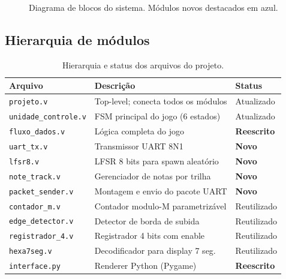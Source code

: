 \documentclass[12pt,a4paper]{article}
\begin{document}
\begin{figure}[H]
\caption{Diagrama de blocos do sistema. Módulos novos destacados em azul.}
\end{figure}

\subsection{Hierarquia de módulos}

\begin{table}[H]
\centering
\begin{tabularx}{\textwidth}{lXl}
\toprule
\textbf{Arquivo} & \textbf{Descrição} & \textbf{Status} \\
\midrule
\texttt{projeto.v}          & Top-level; conecta todos os módulos  & Atualizado \\
\texttt{unidade\_controle.v}& FSM principal do jogo (6 estados)    & Atualizado \\
\texttt{fluxo\_dados.v}     & Lógica completa do jogo              & \textcolor{fpgablue}{\textbf{Reescrito}} \\
\texttt{uart\_tx.v}         & Transmissor UART 8N1                 & \textcolor{fpgablue}{\textbf{Novo}} \\
\texttt{lfsr8.v}            & LFSR 8 bits para spawn aleatório     & \textcolor{fpgablue}{\textbf{Novo}} \\
\texttt{note\_track.v}      & Gerenciador de notas por trilha      & \textcolor{fpgablue}{\textbf{Novo}} \\
\texttt{packet\_sender.v}   & Montagem e envio do pacote UART      & \textcolor{fpgablue}{\textbf{Novo}} \\
\texttt{contador\_m.v}      & Contador modulo-M parametrizável     & Reutilizado \\
\texttt{edge\_detector.v}   & Detector de borda de subida          & Reutilizado \\
\texttt{registrador\_4.v}   & Registrador 4 bits com enable        & Reutilizado \\
\texttt{hexa7seg.v}         & Decodificador para display 7 seg.    & Reutilizado \\
\texttt{interface.py}       & Renderer Python (Pygame)             & \textcolor{pygreen}{\textbf{Reescrito}} \\
\bottomrule
\end{tabularx}
\caption{Hierarquia e status dos arquivos do projeto.}
\end{table}
\end{document}
